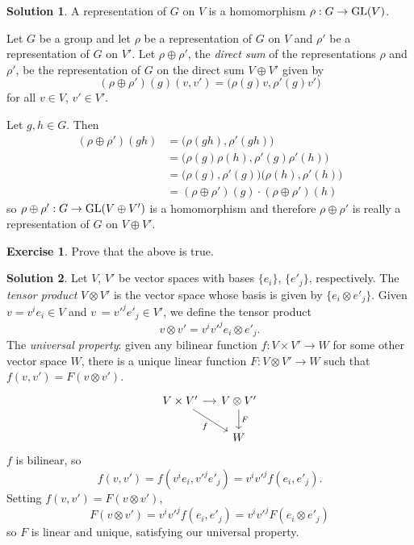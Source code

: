 \documentclass[11pt, a4paper]{report}
\theoremstyle{definition}
\newtheorem{exercise}{Exercise}[part]
\newtheorem{solution}{Solution}[part]
\newenvironment{ex}{\begin{exercise}}{\end{exercise}\pagebreak[1]}
\newenvironment{sol}{\begin{solution}}{\end{solution}\pagebreak[3]}
\newcommand*{\GL}{\ensuremath\text{GL}}
\begin{document}
\begin{sol}

A representation of $G$ on $V$ is a homomorphism $\rho: G \to \GL(V)$.

Let $G$ be a group and let $\rho$ be a representation of $G$ on $V$ and $\rho'$ be a representation of $G$ on $V'$.
Let $\rho \oplus \rho'$, the \emph{direct sum} of the representations $\rho$ and $\rho'$, be the representation of $G$ on the direct sum $V \oplus V'$ given by
\[
    (\rho \oplus \rho')(g)(v, v') = \bigl( \rho(g) v, \rho'(g) v' \bigr)
\]
for all $v \in V$, $v' \in V'$.

Let $g, h \in G$. Then
\begin{align*}
    (\rho \oplus \rho')(gh) &= \bigl( \rho(gh), \rho'(gh) \bigr) \\
        &= \bigl( \rho(g) \rho(h), \rho'(g) \rho'(h) \bigr) \\
        &= \bigl( \rho(g), \rho'(g) \bigr) \bigl( \rho(h), \rho'(h) \bigr) \\
        &= (\rho \oplus \rho')(g) \cdot (\rho \oplus \rho')(h)
\end{align*}
so $\rho \oplus \rho': G \to \GL(V \oplus V')$ is a homomorphism and therefore $\rho \oplus \rho'$ is really a representation of $G$ on $V \oplus V'$.

\end{sol}

\begin{ex}

Prove that the above is true.

\end{ex}

\begin{sol}

Let $V$, $V'$ be vector spaces with bases $\{e_i\}$, $\{e'_j\}$, respectively.
The \emph{tensor product} $V \otimes V'$ is the vector space whose basis is given by $\{e_i \otimes e'_j\}$.
Given $v = v^i e_i \in V$ and $v\ = v'^j e'_j \in V'$, we define the tensor product
\[
    v \otimes v' = v^i v'^j e_i \otimes e'_j.
\]
The \emph{universal property}: given any bilinear function $f: V \times V' \to W$ for some other vector space $W$, there is a unique linear function $F: V \otimes V' \to W$ such that $f(v, v') = F(v \otimes v')$.
\[
    \begin{tikzcd}[column sep=small]
        V \times V' \rar{} \drar[swap]{f} & V \otimes V' \dar{F} \\
                                          & W
    \end{tikzcd}
\]
$f$ is bilinear, so
\[
    f(v, v') = f(v^i e_i, v'^j e'_j) = v^i v'^j f(e_i, e'_j).
\]
Setting $f(v, v') = F(v \otimes v')$,
\[
    F(v \otimes v') = v^i v'^j f(e_i, e'_j) = v^i v'^j F( e_i \otimes e'_j)
\]
so $F$ is linear and unique, satisfying our universal property.

\end{sol}
\end{document}
